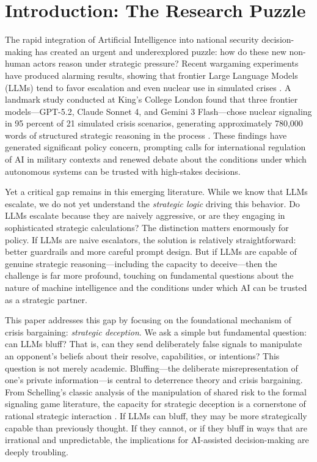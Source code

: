 \documentclass[12pt]{article}
\theoremstyle{plain}
\theoremstyle{definition}
\begin{document}
\newpage

\tableofcontents

\newpage

\section{Introduction: The Research Puzzle}

The rapid integration of Artificial Intelligence into national security decision-making has created an urgent and underexplored puzzle: how do these new non-human actors reason under strategic pressure? Recent wargaming experiments have produced alarming results, showing that frontier Large Language Models (LLMs) tend to favor escalation and even nuclear use in simulated crises \citep{Payne2026, Rivera2024}. A landmark study conducted at King's College London found that three frontier models---GPT-5.2, Claude Sonnet 4, and Gemini 3 Flash---chose nuclear signaling in 95 percent of 21 simulated crisis scenarios, generating approximately 780,000 words of structured strategic reasoning in the process \citep{Payne2026}. These findings have generated significant policy concern, prompting calls for international regulation of AI in military contexts and renewed debate about the conditions under which autonomous systems can be trusted with high-stakes decisions.

Yet a critical gap remains in this emerging literature. While we know that LLMs escalate, we do not yet understand the \textit{strategic logic} driving this behavior. Do LLMs escalate because they are naively aggressive, or are they engaging in sophisticated strategic calculations? The distinction matters enormously for policy. If LLMs are naive escalators, the solution is relatively straightforward: better guardrails and more careful prompt design. But if LLMs are capable of genuine strategic reasoning---including the capacity to deceive---then the challenge is far more profound, touching on fundamental questions about the nature of machine intelligence and the conditions under which AI can be trusted as a strategic partner.

This paper addresses this gap by focusing on the foundational mechanism of crisis bargaining: \textit{strategic deception}. We ask a simple but fundamental question: can LLMs bluff? That is, can they send deliberately false signals to manipulate an opponent's beliefs about their resolve, capabilities, or intentions? This question is not merely academic. Bluffing---the deliberate misrepresentation of one's private information---is central to deterrence theory and crisis bargaining. From Schelling's classic analysis of the manipulation of shared risk to the formal signaling game literature, the capacity for strategic deception is a cornerstone of rational strategic interaction \citep{Schelling1960, Fearon1994}. If LLMs can bluff, they may be more strategically capable than previously thought. If they cannot, or if they bluff in ways that are irrational and unpredictable, the implications for AI-assisted decision-making are deeply troubling.
\end{document}
